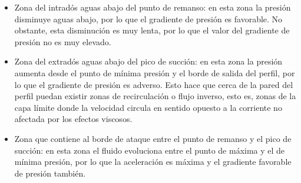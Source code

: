 \begin{itemize}
\item Zona del intradós aguas abajo del punto de remanso: en esta zona la presión disminuye aguas abajo, por lo que el gradiente de presión es favorable. No obstante, esta disminución es muy lenta, por lo que el valor del gradiente de presión no es muy elevado.
\item Zona del extradós aguas abajo del pico de succión: en esta zona la presión aumenta desde el punto de mínima presión y el borde de salida del perfil, por lo que el gradiente de presión es adverso. Esto hace que cerca de la pared del perfil puedan existir zonas de recirculación o flujo inverso, esto es, zonas de la capa límite donde la velocidad circula en sentido opuesto a la corriente no afectada por los efectos viscosos. 
\item Zona que contiene al borde de ataque entre el punto de remanso y el pico de succión: en esta zona el fluido evoluciona entre el punto de máxima y el de mínima presión, por lo que la aceleración es máxima y el gradiente favorable de presión también. 
\end{itemize}



